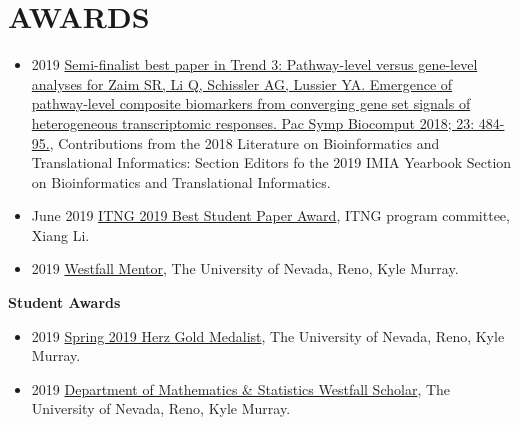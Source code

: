 \documentclass[paper=a4,fontsize=11pt]{scrartcl} %
\newcommand{\NewPart}[2]{\section*{\uppercase{#1} #2 }}
\begin{document}

 

\NewPart{Awards}{}
\vspace{-7pt}

\begin{itemize}[noitemsep]
   \item 2019 \href{https://www.thieme-connect.com/products/ejournals/html/10.1055/s-0039-1677945#N67545}{Semi-finalist best paper in Trend 3: Pathway-level versus gene-level analyses for Zaim SR, Li Q, Schissler AG, Lussier YA. Emergence of pathway-level composite biomarkers from converging gene set signals of heterogeneous transcriptomic responses. Pac Symp Biocomput 2018; 23: 484-95.}, Contributions from the 2018 Literature on Bioinformatics and Translational Informatics: Section Editors fo the 2019 IMIA Yearbook Section on Bioinformatics and Translational Informatics.
    \item June 2019 \href{https://http://www.itng.info/}{ITNG 2019 Best Student Paper Award}, ITNG program committee, Xiang Li.
    \item 2019 \href{https://www.unr.edu/science/student-resources/student-competitions-awards}{Westfall Mentor}, The University of Nevada, Reno, Kyle Murray.
\end{itemize}

\textbf{Student Awards}

\begin{itemize}[noitemsep]
\item 2019 \href{https://www.unr.edu/nevada-today/news/2019/spring-2019-herz-gold-medalist?utm_source=newsletter051619&utm_medium=email&utm_content=kylemurray&utm_campaign=NevadaWeekly}{Spring 2019 Herz Gold Medalist}, The University of Nevada, Reno, Kyle Murray.
  \item 2019 \href{https://www.unr.edu/science/student-resources/student-competitions-awards}{Department of Mathematics \& Statistics Westfall Scholar}, The University of Nevada, Reno, Kyle Murray.

\vspace{-7pt}
\end{itemize}  
\end{document}

